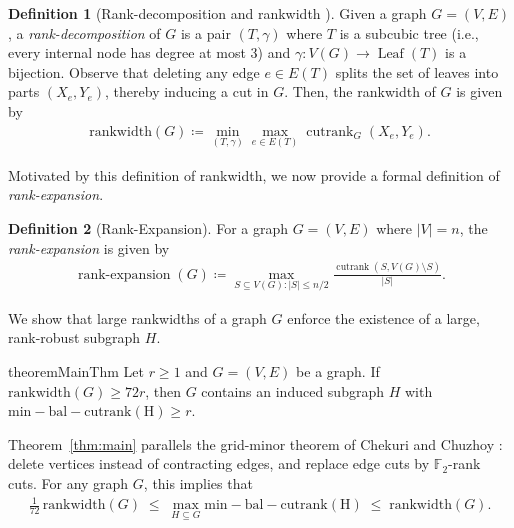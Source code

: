 \documentclass{article}
\theoremstyle{definition}
\newtheorem{definition}{Definition}[section]
\begin{document}
\begin{definition}[Rank-decomposition and rankwidth \cite{Oum_Seymour_2006, Voigt}] Given a graph $G=(V, E)$, a \emph{rank-decomposition} of $G$ is a pair $(T,\gamma)$ where $T$ is a subcubic tree (i.e., every internal node has degree at most $3$) and $\gamma\colon V(G)\to\operatorname{Leaf}(T)$ is a bijection. Observe that
deleting any edge $e\in E(T)$ splits the set of leaves into parts $(X_e,Y_e)$, thereby inducing a cut in $G$.  
Then, the rankwidth of $G$ is given by
\begin{align}\mathrm{rankwidth}(G) \coloneqq \min_{(T,\gamma)} \max_{e\in E(T)}\operatorname{cutrank}_G(X_e,Y_e).\end{align}
\end{definition}

Motivated by this definition of rankwidth, we now provide a formal definition of \emph{rank-expansion}.

\begin{definition}[Rank-Expansion]\label{def: rank-expansion} 
For a graph $G=(V,E)$ where $|V|=n$, the \emph{rank-expansion} is given by
    \begin{align}\operatorname{rank-expansion}(G) \coloneqq \max_{S\subseteq V(G): |S|\leq n/2} \frac{\operatorname{cutrank}(S, V(G)\setminus S)}{|S|}.\end{align}
\end{definition}

We show that large rankwidths of a graph $G$ enforce the existence of a large, rank-robust subgraph $H$.

\begin{restatable}{theorem}{MainThm}
\label{thm:main}
Let $r\ge1$ and $G=(V, E)$ be a graph. If $\mathrm{rankwidth}(G)\ge 72r$, then $G$ contains an induced subgraph $H$ with $\operatorname{min-bal-cutrank(H)}\ge r$.
\end{restatable}


\noindent Theorem~\ref{thm:main} parallels the grid-minor theorem of   Chekuri and Chuzhoy \cite{doi:10.1137/1.9781611977912.48, Geelen_2023, 10.1145/2820609}: delete vertices instead of contracting edges, and replace edge cuts by $\mathbb{F}_2$-rank cuts. For any graph $G$, this implies that
\begin{align}
\tfrac1{72}\,\mathrm{rankwidth}(G)\;\le\;
\max_{H\subseteq G}\operatorname{min-bal-cutrank(H)}
\;\le\;
\mathrm{rankwidth}(G).
\end{align}
\end{document}
